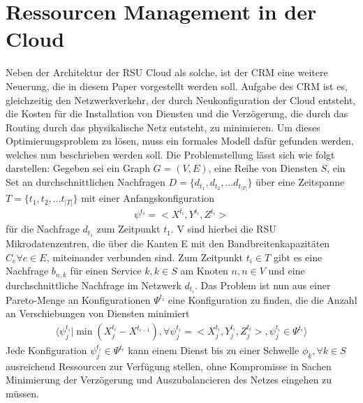 \documentclass[conference]{IEEEtran}
\begin{document}
\section{Ressourcen Management in der Cloud}

Neben der Architektur der RSU Cloud als solche, ist der CRM eine weitere
Neuerung, die in diesem Paper vorgestellt werden soll.  Aufgabe des CRM ist es, gleichzeitig den Netzwerkverkehr, der durch Neukonfiguration der Cloud entsteht, die Kosten für die Installation von Diensten und die Verzögerung, die durch das Routing durch das physikalische Netz entsteht, zu minimieren.
Um dieses Optimierungsproblem zu lösen, muss ein formales Modell dafür gefunden werden, welches nun beschrieben werden soll. Die Problemstellung lässt sich wie folgt darstellen: Gegeben sei ein Graph \(G=(V,E)\), eine Reihe von Diensten \(S\), ein Set an durchschnittlichen Nachfragen \(D=\{d_{t_1},d_{t_2},…d_{t_{|T|}}\}\) über eine Zeitspanne \(T=\{t_1,t_2,… t_{|T|}\}\) mit einer Anfangskonfiguration \begin{align*} \psi^{t_i}=<X^{t_i},Y^{t_i},Z^{t_i}> \end{align*} für die Nachfrage \(d_{t_1}\)
zum Zeitpunkt \(t_1\). V sind hierbei die RSU Mikrodatenzentren, die über die Kanten E mit
den Bandbreitenkapazitäten \(C_e \forall e \in E\), miteinander verbunden sind. Zum
Zeitpunkt \(t_i \in T\) gibt es eine Nachfrage \(b_{n,k}\) für einen Service \(k, k \in S\) am Knoten \(n, n\in V\) und eine durchschnittliche Nachfrage im Netzwerk \(d_{t_i}\). Das Problem ist nun aus einer Pareto-Menge an Konfigurationen \(\Psi^{t_i}\) eine Konfiguration zu finden, die die Anzahl an Verschiebungen von Diensten minimiert 
\begin{align*}
\langle \psi_{j}^{t_i}|\min(X_{j}^{t_i}-X^{t_{i-1}}),\forall \psi_{j}^{t_i}=<X_{j}^{t_i},Y_{j}^{t_i},Z_{j}^{t_i}>, \psi_{j}^{t_i} \in \Psi^{t_i}  \rangle
\end{align*}
Jede Konfiguration \(\psi_{j}^{t_i} \in \Psi^{t_i}\) kann einem Dienst bis zu einer Schwelle \(\phi_k, \forall k \in S\) ausreichend Ressourcen zur Verfügung stellen, ohne Kompromisse in Sachen Minimierung der Verzögerung und Auszubalancieren des Netzes eingehen zu müssen.\\
\end{document}
